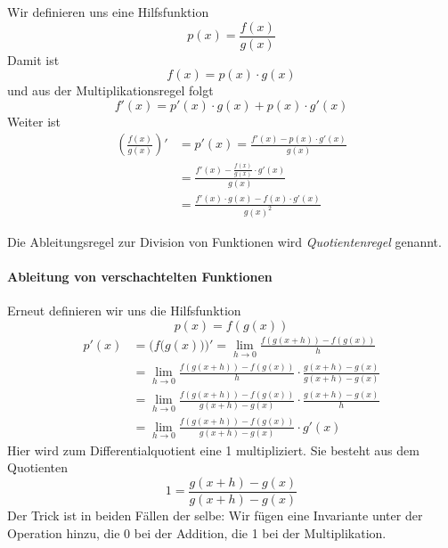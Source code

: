 Wir definieren uns eine Hilfsfunktion 
\begin{equation*}
p(x) = \frac{f(x)}{g(x)}
\end{equation*}
Damit ist 
\begin{equation*}
f(x) = p(x) \cdot g(x)
\end{equation*}
und aus der Multiplikationsregel folgt
\begin{equation*}
f'(x) = p'(x)\cdot g(x)+p(x)\cdot g'(x)
\end{equation*}
Weiter ist
\begin{equation}
\begin{split}
\left( \frac{f(x)}{g(x)} \right)' &= p'(x) = \frac{f'(x)-p(x)\cdot g'(x)}{g(x)} \\
&= \frac{f'(x)-\frac{f(x)}{g(x)}\cdot g'(x)}{g(x)} \\
&= \frac{f'(x)\cdot g(x)-f(x)\cdot g'(x)}{g(x)^2}
\end{split}
\end{equation}

\begin{definition}
Die Ableitungsregel zur Division von Funktionen wird \emph{Quotientenregel} genannt.
\end{definition}

\paragraph{Ableitung von verschachtelten Funktionen}
Erneut definieren wir uns die Hilfsfunktion
\begin{equation*}
p(x) = f(g(x))
\end{equation*}
\begin{equation}
\begin{split}
p'(x) &= \Big(f\big( g(x) \big)\Big)' = \lim_{h\rightarrow 0} \frac{f(g(x+h))-f(g(x))}{h}\\
&= \lim_{h\rightarrow 0} \frac{f(g(x+h))-f(g(x))}{h} \cdot \frac{g(x+h)-g(x)}{g(x+h)-g(x)} \\
&= \lim_{h\rightarrow 0} \frac{f(g(x+h))-f(g(x))}{g(x+h)-g(x)} \cdot \frac{g(x+h)-g(x)}{h} \\
&= \lim_{h\rightarrow 0} \frac{f(g(x+h))-f(g(x))}{g(x+h)-g(x)} \cdot g'(x)
\end{split}
\end{equation}
Hier wird zum Differentialquotient eine 1 multipliziert. Sie besteht aus dem Quotienten
\begin{equation*}
1=\frac{g(x+h)-g(x)}{g(x+h)-g(x)}
\end{equation*}
Der Trick ist in beiden Fällen der selbe: Wir fügen eine Invariante unter der Operation hinzu, die 0 bei der Addition, die 1 bei der Multiplikation.

